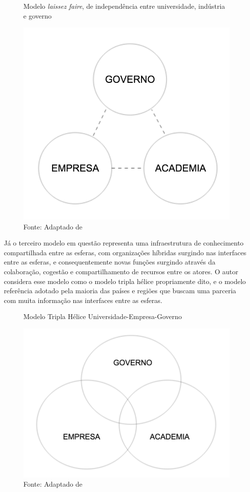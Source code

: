 \begin{figure}[H]
\caption{Modelo \textit{laissez faire}, de independência entre universidade, indústria e governo}
\centerline{\includegraphics[scale=0.5]{img/triplehelix2}}
\label{fig:triplehelix2}
\caption* {Fonte: Adaptado de }
\end{figure}

Já o terceiro modelo em questão representa uma infraestrutura de conhecimento compartilhada entre as esferas, com organizações híbridas surgindo nas interfaces entre as esferas, e consequentemente novas funções surgindo através da colaboração, cogestão e compartilhamento de recursos entre os atores. O autor considera esse modelo como o modelo tripla hélice propriamente dito, e o modelo referência adotado pela maioria das países e regiões que buscam uma parceria com muita informação nas interfaces entre as esferas. 


\begin{figure}[H]
\caption{Modelo Tripla Hélice Universidade-Empresa-Governo}
\centerline{\includegraphics[scale=0.5]{img/triplehelix3}}
\label{fig:triplehelix3}
\caption* {Fonte: Adaptado de }
\end{figure}

